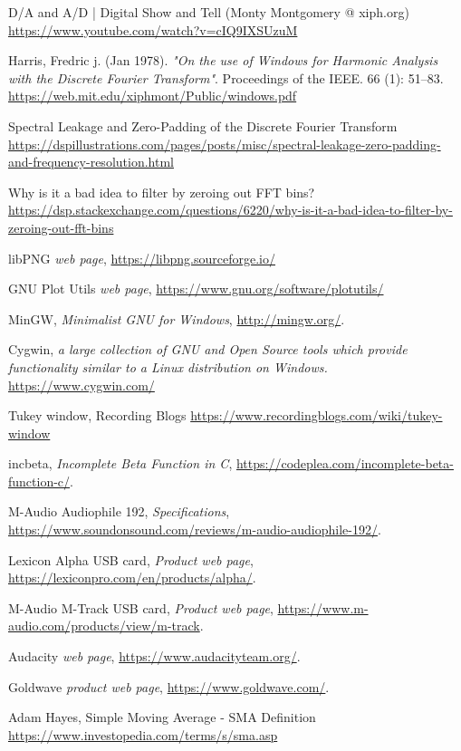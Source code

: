 \documentclass[10pt,a4paper]{report}
\begin{document}
\begin{thebibliography}{9}
	D/A and A/D | Digital Show and Tell (Monty Montgomery @ xiph.org)
	\url{https://www.youtube.com/watch?v=cIQ9IXSUzuM}
	
	Harris, Fredric j. (Jan 1978). \textit{"On the use of Windows for Harmonic Analysis with the Discrete Fourier Transform"}. Proceedings of the IEEE. 66 (1): 51–83.
	\url{https://web.mit.edu/xiphmont/Public/windows.pdf}
	
	Spectral Leakage and Zero-Padding of the Discrete Fourier Transform
	\url{https://dspillustrations.com/pages/posts/misc/spectral-leakage-zero-padding-and-frequency-resolution.html}
	
	Why is it a bad idea to filter by zeroing out FFT bins?
	\url{https://dsp.stackexchange.com/questions/6220/why-is-it-a-bad-idea-to-filter-by-zeroing-out-fft-bins}
	
	libPNG
	\textit{web page},
	\url{https://libpng.sourceforge.io/}
	
	GNU Plot Utils
	\textit{web page},
	\url{https://www.gnu.org/software/plotutils/}
	
	MinGW, 
	\textit{Minimalist GNU for Windows},
	\url{http://mingw.org/}.
	
	Cygwin,
	\textit{a large collection of GNU and Open Source tools which provide functionality similar to a Linux distribution on Windows.}
	\url{https://www.cygwin.com/}
	
	Tukey window, Recording Blogs
	\url{https://www.recordingblogs.com/wiki/tukey-window}
	
	incbeta, 
	\textit{Incomplete Beta Function in C},
	\url{https://codeplea.com/incomplete-beta-function-c/}.
	
	M-Audio Audiophile 192,
	\textit{Specifications},
	\url{https://www.soundonsound.com/reviews/m-audio-audiophile-192/}.
	
	Lexicon Alpha USB card,
	\textit{Product web page},
	\url{https://lexiconpro.com/en/products/alpha/}.
	
	M-Audio M-Track USB card,
	\textit{Product web page},
	\url{	https://www.m-audio.com/products/view/m-track}.
	
	Audacity
	\textit{web page},
	\url{https://www.audacityteam.org/}.
	
	Goldwave
	\textit{product web page},
	\url{https://www.goldwave.com/}.
	
	Adam Hayes, Simple Moving Average - SMA Definition
	\url{https://www.investopedia.com/terms/s/sma.asp}
\end{thebibliography}

\printglossaries
\end{document}
